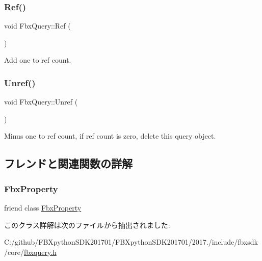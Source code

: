 \mbox{\label{class_fbx_query_a0d945a2be30bcfe72a083f0af90d8252}} 
\subsubsection{\texorpdfstring{Ref()}{Ref()}}
{\footnotesize\ttfamily void Fbx\+Query\+::\+Ref (\begin{DoxyParamCaption}{ }\end{DoxyParamCaption})}



Add one to ref count. 

\mbox{\label{class_fbx_query_a572e8b1922846020818adfbdc2a48f74}} 
\subsubsection{\texorpdfstring{Unref()}{Unref()}}
{\footnotesize\ttfamily void Fbx\+Query\+::\+Unref (\begin{DoxyParamCaption}{ }\end{DoxyParamCaption})}



Minus one to ref count, if ref count is zero, delete this query object. 



\subsection{フレンドと関連関数の詳解}
\mbox{\label{class_fbx_query_a5d7018830479ec28905f28575480f88f}} 
\subsubsection{\texorpdfstring{Fbx\+Property}{FbxProperty}}
{\footnotesize\ttfamily friend class \hyperlink{class_fbx_property}{Fbx\+Property}\hspace{0.3cm}{\ttfamily [friend]}}



このクラス詳解は次のファイルから抽出されました\+:\begin{DoxyCompactItemize}
\item 
C\+:/github/\+F\+B\+Xpython\+S\+D\+K201701/\+F\+B\+Xpython\+S\+D\+K201701/2017./include/fbxsdk/core/\hyperlink{fbxquery_8h}{fbxquery.\+h}\end{DoxyCompactItemize}
